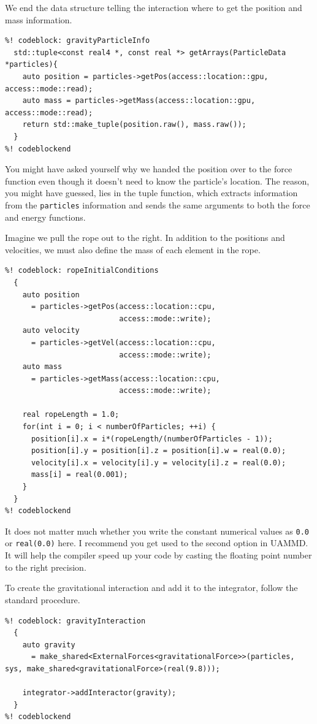 We end the data structure telling the interaction where to get the position and
mass information.
\begin{lstlisting}
%! codeblock: gravityParticleInfo
  std::tuple<const real4 *, const real *> getArrays(ParticleData *particles){
    auto position = particles->getPos(access::location::gpu, access::mode::read);
    auto mass = particles->getMass(access::location::gpu, access::mode::read);
    return std::make_tuple(position.raw(), mass.raw());
  }
%! codeblockend
\end{lstlisting}
You might have asked yourself why we handed the position over to the force
function even though it doesn't need to know the particle's location. The reason,
you might have guessed, lies in the tuple function, which extracts information
from the \texttt{particles} information and sends the same arguments to both the
force and energy functions.

Imagine we pull the rope out to the right. In addition to the positions and
velocities, we must also define the mass of each element in the rope.
\begin{lstlisting}
%! codeblock: ropeInitialConditions
  {
    auto position
      = particles->getPos(access::location::cpu,
                          access::mode::write);
    auto velocity
      = particles->getVel(access::location::cpu,
                          access::mode::write);
    auto mass
      = particles->getMass(access::location::cpu,
                          access::mode::write);

    real ropeLength = 1.0;
    for(int i = 0; i < numberOfParticles; ++i) {
      position[i].x = i*(ropeLength/(numberOfParticles - 1));
      position[i].y = position[i].z = position[i].w = real(0.0);
      velocity[i].x = velocity[i].y = velocity[i].z = real(0.0);
      mass[i] = real(0.001);
    }
  }
%! codeblockend
\end{lstlisting}

It does not matter much whether you write the constant numerical values as 
\texttt{0.0} or \texttt{real(0.0)} here. I recommend you get used to the second 
option in UAMMD. It will help the compiler speed up your code by casting the 
floating point number to the right precision.

To create the gravitational interaction and add it to the integrator, follow the
standard procedure.
\begin{lstlisting}
%! codeblock: gravityInteraction
  {
    auto gravity
      = make_shared<ExternalForces<gravitationalForce>>(particles, sys, make_shared<gravitationalForce>(real(9.8)));

    integrator->addInteractor(gravity);
  }
%! codeblockend
\end{lstlisting}

